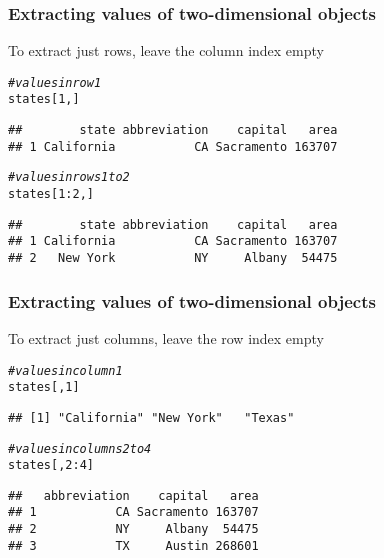 \documentclass[12pt]{beamer}\usepackage[]{graphicx}\usepackage[]{color}
\makeatletter
\newcommand{\hlnum}[1]{\textcolor[rgb]{0.686,0.059,0.569}{#1}}%
\newcommand{\hlcom}[1]{\textcolor[rgb]{0.678,0.584,0.686}{\textit{#1}}}%
\newcommand{\hlopt}[1]{\textcolor[rgb]{0,0,0}{#1}}%
\newcommand{\hlstd}[1]{\textcolor[rgb]{0.345,0.345,0.345}{#1}}%
\newenvironment{kframe}{%
 \def\at@end@of@kframe{}%
 \ifinner\ifhmode%
  \def\at@end@of@kframe{\end{minipage}}%
  \begin{minipage}{\columnwidth}%
 \fi\fi%
 \def\FrameCommand##1{\hskip\@totalleftmargin \hskip-\fboxsep
 \colorbox{shadecolor}{##1}\hskip-\fboxsep
     \hskip-\linewidth \hskip-\@totalleftmargin \hskip\columnwidth}%
 \MakeFramed {\advance\hsize-\width
   \@totalleftmargin\z@ \linewidth\hsize
   \@setminipage}}%
 {\par\unskip\endMakeFramed%
 \at@end@of@kframe}
\newenvironment{knitrout}{}{} %
\makeatother
\begin{document}
\begin{frame}[fragile]
\frametitle{Extracting values of two-dimensional objects}

To extract just rows, leave the column index empty
\begin{knitrout}\footnotesize
{}\color{fgcolor}\begin{kframe}
\begin{alltt}
\hlcom{# values in row 1}
\hlstd{states[}\hlnum{1}\hlstd{, ]}
\end{alltt}
\begin{verbatim}
##        state abbreviation    capital   area
## 1 California           CA Sacramento 163707
\end{verbatim}
\begin{alltt}
\hlcom{# values in rows 1 to 2}
\hlstd{states[}\hlnum{1}\hlopt{:}\hlnum{2}\hlstd{, ]}
\end{alltt}
\begin{verbatim}
##        state abbreviation    capital   area
## 1 California           CA Sacramento 163707
## 2   New York           NY     Albany  54475
\end{verbatim}
\end{kframe}
\end{knitrout}

\end{frame}


\begin{frame}[fragile]
\frametitle{Extracting values of two-dimensional objects}

To extract just columns, leave the row index empty
\begin{knitrout}\footnotesize
{}\color{fgcolor}\begin{kframe}
\begin{alltt}
\hlcom{# values in column 1}
\hlstd{states[ ,} \hlnum{1}\hlstd{]}
\end{alltt}
\begin{verbatim}
## [1] "California" "New York"   "Texas"
\end{verbatim}
\begin{alltt}
\hlcom{# values in columns 2 to 4}
\hlstd{states[ ,} \hlnum{2}\hlopt{:}\hlnum{4}\hlstd{]}
\end{alltt}
\begin{verbatim}
##   abbreviation    capital   area
## 1           CA Sacramento 163707
## 2           NY     Albany  54475
## 3           TX     Austin 268601
\end{verbatim}
\end{kframe}
\end{knitrout}

\end{frame}
\end{document}
